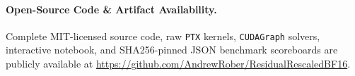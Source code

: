 \documentclass[11pt,a4paper]{article}
\newif\ifanonymous
\theoremstyle{definition}
\theoremstyle{remark}
\begin{document}
\ifanonymous
\paragraph{Reproducibility Manifest.}
Complete anonymized Python package \texttt{residual\_rescaled\_bf16}, raw \texttt{PTX} assembly, single-command benchmark scripts (\texttt{scripts/run\_stage\_a..e}), deterministic verification suite (\texttt{scripts/verify\_all.py}), and SHA256-verified JSON artifacts are included in the supplementary archive.
\else
\paragraph{Open-Source Code \& Artifact Availability.}
Complete MIT-licensed source code, raw \texttt{PTX} kernels, \texttt{CUDAGraph} solvers, interactive notebook, and SHA256-pinned JSON benchmark scoreboards are publicly available at \url{https://github.com/AndrewRober/ResidualRescaledBF16}.
\fi
\end{document}
